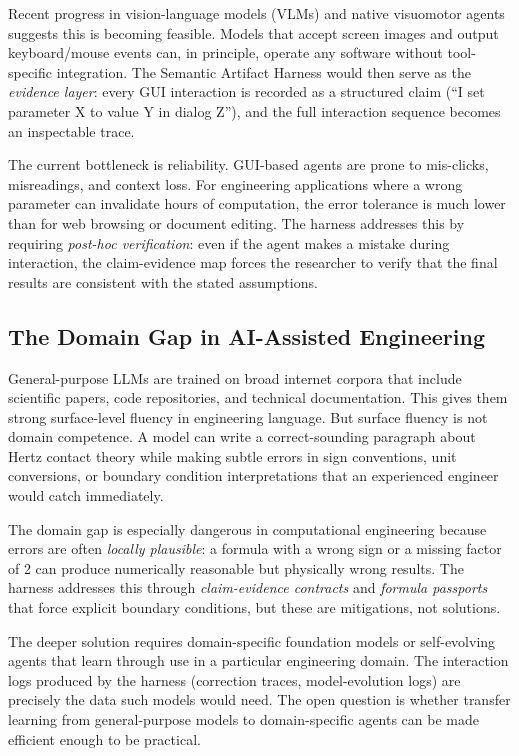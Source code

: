 \documentclass{article}
\begin{document}
Recent progress in vision-language models (VLMs) and native visuomotor agents suggests this is becoming feasible. Models that accept screen images and output keyboard/mouse events can, in principle, operate any software without tool-specific integration. The Semantic Artifact Harness would then serve as the \emph{evidence layer}: every GUI interaction is recorded as a structured claim (``I set parameter X to value Y in dialog Z''), and the full interaction sequence becomes an inspectable trace.

The current bottleneck is reliability. GUI-based agents are prone to mis-clicks, misreadings, and context loss. For engineering applications where a wrong parameter can invalidate hours of computation, the error tolerance is much lower than for web browsing or document editing. The harness addresses this by requiring \emph{post-hoc verification}: even if the agent makes a mistake during interaction, the claim-evidence map forces the researcher to verify that the final results are consistent with the stated assumptions.

\subsection{The Domain Gap in AI-Assisted Engineering}

General-purpose LLMs are trained on broad internet corpora that include scientific papers, code repositories, and technical documentation. This gives them strong surface-level fluency in engineering language. But surface fluency is not domain competence. A model can write a correct-sounding paragraph about Hertz contact theory while making subtle errors in sign conventions, unit conversions, or boundary condition interpretations that an experienced engineer would catch immediately.

The domain gap is especially dangerous in computational engineering because errors are often \emph{locally plausible}: a formula with a wrong sign or a missing factor of 2 can produce numerically reasonable but physically wrong results. The harness addresses this through \emph{claim-evidence contracts} and \emph{formula passports} that force explicit boundary conditions, but these are mitigations, not solutions.

The deeper solution requires domain-specific foundation models or self-evolving agents that learn through use in a particular engineering domain. The interaction logs produced by the harness (correction traces, model-evolution logs) are precisely the data such models would need. The open question is whether transfer learning from general-purpose models to domain-specific agents can be made efficient enough to be practical.
\end{document}
